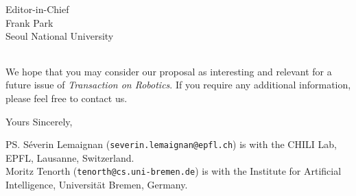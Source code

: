 \documentclass{letter}
\begin{document}
\begin{letter}{Editor-in-Chief \\ Frank Park \\ Seoul National University}
\begin{tabular}{p{2.8cm}p{8cm}p{1.5cm}}
\bottomrule

\end{tabular}



We hope that you may consider our proposal as interesting and relevant for a 
future issue of \emph{Transaction on Robotics}. If you require any additional 
information, please feel free to contact us.

\closing{Yours Sincerely,}

\ps{Séverin Lemaignan ({\tt severin.lemaignan@epfl.ch}) is with the CHILI Lab, EPFL, Lausanne, Switzerland.\\ 
Moritz Tenorth ({\tt tenorth@cs.uni-bremen.de}) is with the Institute for Artificial Intelligence, Universität Bremen, Germany.}


\end{letter}



\end{document}
